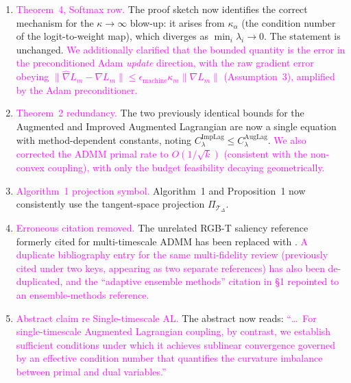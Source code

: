 \documentclass{article}
\newcommand{\audit}[1]{\textcolor{magenta}{#1}}  %
\begin{document}
\begin{enumerate}[leftmargin=*,itemsep=0.4em]
    \item \audit{Theorem~4, Softmax row.} The proof sketch now identifies the
    correct mechanism for the $\kappa\to\infty$ blow-up: it arises from
    $\kappa_\alpha$ (the condition number of the logit-to-weight map), which
    diverges as $\min_i\lambda_i\to 0$. The statement is unchanged.
    \audit{We additionally clarified that the bounded quantity is the
    error in the preconditioned Adam \emph{update} direction, with the raw
    gradient error obeying $\|\hat\nabla L_m-\nabla L_m\|\le\epsilon_{\text{machine}}\kappa_m\|\nabla L_m\|$
    (Assumption~3), amplified by the Adam preconditioner.}

    \item \audit{Theorem~2 redundancy.} The two previously identical bounds for
    the Augmented and Improved Augmented Lagrangian are now a single equation
    with method-dependent constants, noting
    $C_\lambda^{\text{ImpLag}} \le C_\lambda^{\text{AugLag}}$. \audit{We also
    corrected the ADMM primal rate to $O(1/\sqrt{k})$ (consistent with the
    non-convex coupling), with only the budget feasibility decaying
    geometrically.}

    \item \audit{Algorithm~1 projection symbol.} Algorithm~1 and Proposition~1
    now consistently use the tangent-space projection $\Pi_{\mathcal{T}_\Delta}$.

    \item \audit{Erroneous citation removed.} The unrelated RGB-T saliency
    reference formerly cited for multi-timescale ADMM has been replaced with
    \cite{zeng2021admm_constrained_problems_convergence_saturation, chen2017note_admm_constrained_problems, boyd2011distributed}.
    \audit{A duplicate bibliography entry for the same multi-fidelity review
    (previously cited under two keys, appearing as two separate references) has
    also been de-duplicated, and the ``adaptive ensemble methods'' citation in
    \S1 repointed to an ensemble-methods reference.}

    \item \audit{Abstract claim re Single-timescale AL.} The abstract now reads:
    \audit{``\ldots~For single-timescale Augmented Lagrangian coupling, by
    contrast, we establish sufficient conditions under which it achieves
    sublinear convergence governed by an effective condition number that
    quantifies the curvature imbalance between primal and dual variables.''}


\end{enumerate}
\end{document}
